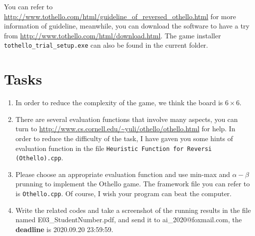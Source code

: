 ﻿\documentclass[a4paper, 11pt]{article}
\begin{document}
You can refer to \url{http://www.tothello.com/html/guideline_of_reversed_othello.html} for more information of guideline, meanwhile, you can download the software to have a try from \url{http://www.tothello.com/html/download.html}. The game installer \texttt{tothello\_trial\_setup.exe} can also be found in the current folder.



\section{Tasks}
\begin{enumerate}

\item In order to reduce the complexity of the game, we think the board is $6\times 6$.

\item There are several evaluation functions that involve many aspects, you can turn to \url{http://www.cs.cornell.edu/~yuli/othello/othello.html} for help. In order to reduce the difficulty of the task, I have gaven you some hints of evaluation function in the file \texttt{Heuristic Function for Reversi (Othello).cpp}.

\item Please choose an appropriate evaluation function and use min-max and $\alpha-\beta$ prunning to implement the Othello game. The framework file you can refer to is \texttt{Othello.cpp}. Of course, I wish your program can beat the computer.

\item Write the related codes and take a screenshot of the running results in the file named \textsf{E03\_StudentNumber.pdf}, and send it to \textsf{ai\_2020@foxmail.com}, the \textbf{deadline} is 2020.09.20 23:59:59.
\end{enumerate}
\end{document}
